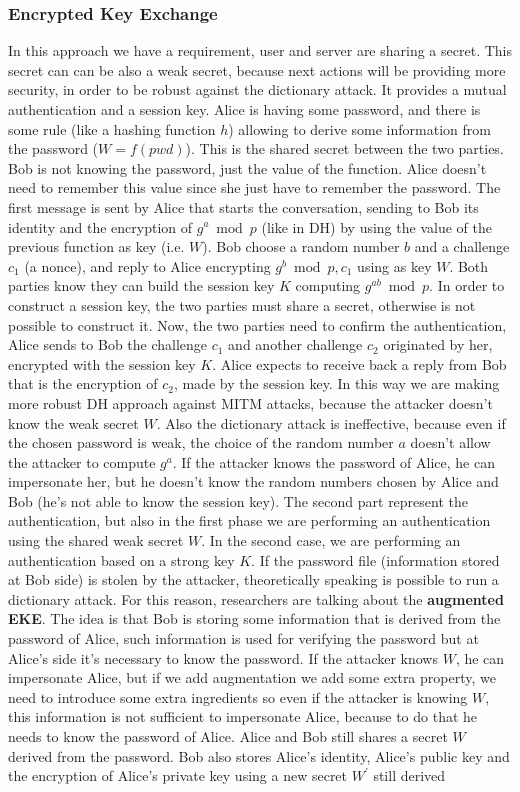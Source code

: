 \documentclass[11pt]{article}
\begin{document}
\subsubsection{Encrypted Key Exchange}
In this approach we have a requirement, user and server are sharing a secret. This secret can can be also a weak secret, because next actions will be providing more security, in order to be robust against the dictionary attack. It provides a mutual authentication and a session key. Alice is having some password, and there is some rule (like a hashing function $h$) allowing to derive some information from the password ($W = f(pwd)$). This is the shared secret between the two parties. Bob is not knowing the password, just the value of the function. Alice doesn't need to remember this value since she just have to remember the password. The first message is sent by Alice that starts the conversation, sending to Bob its identity and the encryption of $g^a \bmod p$ (like in DH) by using the value of the previous function as key (i.e. $W$). Bob choose a random number $b$ and a challenge $c_1$ (a nonce), and reply to Alice encrypting $g^b \bmod p, c_1$ using as key $W$. Both parties know they can build the session key $K$ computing $g^{ab} \bmod p$. In order to construct a session key, the two parties must share a secret, otherwise is not possible to construct it. Now, the two parties need to confirm the authentication, Alice sends to Bob the challenge $c_1$ and another challenge $c_2$ originated by her, encrypted with the session key $K$. Alice expects to receive back a reply from Bob that is the encryption of $c_2$, made by the session key. In this way we are making more robust DH approach against MITM attacks, because the attacker doesn't know the weak secret $W$. Also the dictionary attack is ineffective, because even if the chosen password is weak, the choice of the random number $a$ doesn't allow the attacker to compute $g^a$. If the attacker knows the password of Alice, he can impersonate her, but he doesn't know the random numbers chosen by Alice and Bob (he's not able to know the session key). The second part represent the authentication, but also in the first phase we are performing an authentication using the shared weak secret $W$. In the second case, we are performing an authentication based on a strong key $K$. If the password file (information stored at Bob side) is stolen by the attacker, theoretically speaking is possible to run a dictionary attack. For this reason, researchers are talking about the \textbf{augmented EKE}. The idea is that Bob is storing some information that is derived from the password of Alice, such information is used for verifying the password but at Alice's side it's necessary to know the password. If the attacker knows $W$, he can impersonate Alice, but if we add augmentation we add some extra property, we need to introduce some extra ingredients so even if the attacker is knowing $W$, this information is not sufficient to impersonate Alice, because to do that he needs to know the password of Alice. Alice and Bob still shares a secret $W$ derived from the password. Bob also stores Alice's identity, Alice's public key and the encryption of Alice's private key using a new secret $W^{'}$ still derived 
\end{document}
